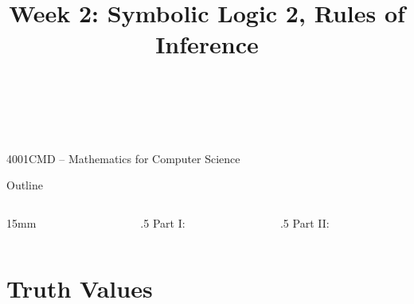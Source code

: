 \documentclass[12pt,aspectratio=1610, handout]{beamer}
\title[Week 2: Logic 2]{Week 2: Symbolic Logic 2, Rules of Inference}
\begin{document}
	\section*{~}	
	\begin{frame}{4001CMD -- Mathematics for Computer Science}		
		\vspace{0cm}
		\begin{center}
		\end{center}
	\end{frame}
	
\hypersetup{linkcolor=blue}
\begin{frame}{Outline}
	
	    \begin{columns}[t]
	    	\begin{column}{15mm}
	    		~
	    	\end{column}
		\begin{column}{.5\textwidth}
			Part I:
			
			\vspace{3mm}
			
			\tableofcontents[sections={1-10}]
		\end{column}
		\begin{column}{.5\textwidth}
			Part II:
			\vspace{3mm}
			
			\tableofcontents[sections={11-20}]
		\end{column}
	\end{columns}
	
\end{frame}
\hypersetup{linkcolor=mygray}	

\section{Truth Values}
\end{document}
